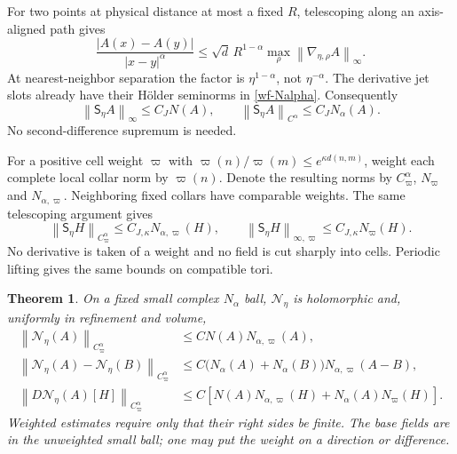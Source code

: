 \documentclass[11pt]{article}
\newtheorem{theorem}{Theorem}[section]
\theoremstyle{remark}
\newcommand{\norm}[1]{\left\|#1\right\|}
\begin{document}
For two points at physical distance at most a fixed $R$,
telescoping along an axis-aligned path gives
\begin{equation}\label{wf-holder-telescoping}
 \frac{|A(x)-A(y)|}{|x-y|^\alpha}
 \le\sqrt d\,R^{1-\alpha}
                      \max_\rho\norm{\nabla_{\eta,\rho}A}_\infty.
\end{equation}
At nearest-neighbor separation the factor is
$\eta^{1-\alpha}$, not $\eta^{-\alpha}$. The derivative
jet slots already have their H\"older seminorms in
\eqref{wf-Nalpha}. Consequently
\begin{equation}\label{wf-jet-norm}
 \norm{\mathsf S_\eta A}_\infty\le C_JN(A),\qquad
 \norm{\mathsf S_\eta A}_{C^\alpha}\le C_JN_\alpha(A).
\end{equation}
No second-difference supremum is needed.

For a positive cell weight $\varpi$ with
$\varpi(n)/\varpi(m)\le e^{\kappa d(n,m)}$, weight each
complete local collar norm by $\varpi(n)$. Denote the
resulting norms by $C^\alpha_\varpi$, $N_\varpi$ and
$N_{\alpha,\varpi}$. Neighboring fixed collars have
comparable weights. The same telescoping argument gives
\begin{equation}\label{wf-weighted-jet}
 \norm{\mathsf S_\eta H}_{C^\alpha_\varpi}
       \le C_{J,\kappa}N_{\alpha,\varpi}(H),\qquad
 \norm{\mathsf S_\eta H}_{\infty,\varpi}
       \le C_{J,\kappa}N_\varpi(H).
\end{equation}
No derivative is taken of a weight and no field is cut
sharply into cells. Periodic lifting gives the same bounds
on compatible tori.

\begin{theorem}\label{wf-nonlinear-theorem}
On a fixed small complex $N_\alpha$ ball, $\mathcal N_\eta$
is holomorphic and, uniformly in refinement and volume,
\begin{align}
 \norm{\mathcal N_\eta(A)}_{C^\alpha_\varpi}
       &\le C N(A)N_{\alpha,\varpi}(A),
                                           \label{wf-quadratic-bound}\\
 \norm{\mathcal N_\eta(A)-\mathcal N_\eta(B)}_{C^\alpha_\varpi}
       &\le C\bigl(N_\alpha(A)+N_\alpha(B)\bigr)
                             N_{\alpha,\varpi}(A-B),
                                           \label{wf-Lipschitz}\\
 \norm{D\mathcal N_\eta(A)[H]}_{C^\alpha_\varpi}
       &\le C\left[N(A)N_{\alpha,\varpi}(H)
                         +N_\alpha(A)N_\varpi(H)\right].
                                           \label{wf-directional}
\end{align}
Weighted estimates require only that their right sides be
finite. The base fields are in the unweighted small ball;
one may put the weight on a direction or difference.
\end{theorem}
\end{document}
